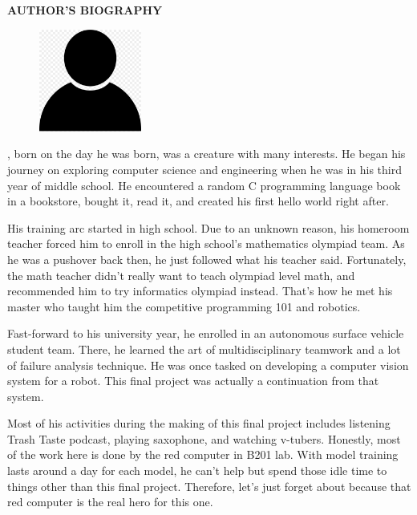 \begin{center}
  \Large
  \textbf{AUTHOR'S BIOGRAPHY}
\end{center}


\vspace{2ex}

\begin{figure}
  \centering
  \vspace{-3ex}
  \includegraphics[width=0.3\textwidth]{figures/profile-silhuette.jpg}
  \vspace{-4ex}
\end{figure}

\name{}, born on the day he was born, was a creature with many interests.
He began his journey on exploring computer science and engineering when he was in his third year of middle school.
He encountered a random C programming language book in a bookstore, bought it, read it, and created his first hello world right after.

His training arc started in high school. 
Due to an unknown reason, his homeroom teacher forced him to enroll in the high school's mathematics olympiad team.
As he was a pushover back then, he just followed what his teacher said.
Fortunately, the math teacher didn't really want to teach olympiad level math, and recommended him to try informatics olympiad instead.
That's how he met his master who taught him the competitive programming 101 and robotics.

Fast-forward to his university year, he enrolled in an autonomous surface vehicle student team.
There, he learned the art of multidisciplinary teamwork and a lot of failure analysis technique. 
He was once tasked on developing a computer vision system for a robot. This final project was actually
a continuation from that system.

Most of his activities during the making of this final project includes listening Trash Taste podcast,
playing saxophone, and watching v-tubers. 
Honestly, most of the work here is done by the red computer in B201 lab.
With model training lasts around a day for each model, he can't help but spend those idle time to things other than this final project.
Therefore, let's just forget about \name{} because that red computer is the real hero for this one.


